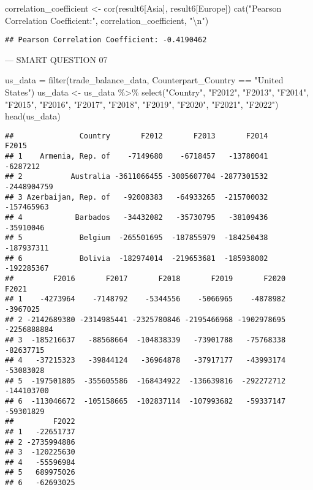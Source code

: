 \documentclass[
]{article}
\newenvironment{Shaded}{\begin{snugshade}}{\end{snugshade}}
\newcommand{\FunctionTok}[1]{\textcolor[rgb]{0.00,0.00,0.00}{#1}}
\newcommand{\NormalTok}[1]{#1}
\newcommand{\OtherTok}[1]{\textcolor[rgb]{0.56,0.35,0.01}{#1}}
\newcommand{\SpecialCharTok}[1]{\textcolor[rgb]{0.00,0.00,0.00}{#1}}
\newcommand{\StringTok}[1]{\textcolor[rgb]{0.31,0.60,0.02}{#1}}
\begin{document}
\begin{Shaded}
\begin{Highlighting}[]
\NormalTok{correlation\_coefficient }\OtherTok{\textless{}{-}} \FunctionTok{cor}\NormalTok{(result6[}\StringTok{\textquotesingle{}Asia\textquotesingle{}}\NormalTok{], result6[}\StringTok{\textquotesingle{}Europe\textquotesingle{}}\NormalTok{])}
\FunctionTok{cat}\NormalTok{(}\StringTok{"Pearson Correlation Coefficient:"}\NormalTok{, correlation\_coefficient, }\StringTok{"}\SpecialCharTok{\textbackslash{}n}\StringTok{"}\NormalTok{)}
\end{Highlighting}
\end{Shaded}

\begin{verbatim}
## Pearson Correlation Coefficient: -0.4190462
\end{verbatim}

--- SMART QUESTION 07

\begin{Shaded}
\begin{Highlighting}[]
\NormalTok{us\_data }\OtherTok{=} \FunctionTok{filter}\NormalTok{(trade\_balance\_data, Counterpart\_Country }\SpecialCharTok{==} \StringTok{"United States"}\NormalTok{)}
\NormalTok{us\_data }\OtherTok{\textless{}{-}}\NormalTok{ us\_data }\SpecialCharTok{\%\textgreater{}\%} 
  \FunctionTok{select}\NormalTok{(}\StringTok{"Country"}\NormalTok{, }\StringTok{"F2012"}\NormalTok{, }\StringTok{"F2013"}\NormalTok{, }\StringTok{"F2014"}\NormalTok{, }\StringTok{"F2015"}\NormalTok{, }\StringTok{"F2016"}\NormalTok{, }\StringTok{"F2017"}\NormalTok{, }\StringTok{"F2018"}\NormalTok{, }\StringTok{"F2019"}\NormalTok{, }\StringTok{"F2020"}\NormalTok{, }\StringTok{"F2021"}\NormalTok{, }\StringTok{"F2022"}\NormalTok{)}
\FunctionTok{head}\NormalTok{(us\_data)}
\end{Highlighting}
\end{Shaded}

\begin{verbatim}
##               Country       F2012       F2013       F2014       F2015
## 1    Armenia, Rep. of    -7149680    -6718457   -13780041    -6287212
## 2           Australia -3611066455 -3005607704 -2877301532 -2448904759
## 3 Azerbaijan, Rep. of   -92008383   -64933265  -215700032  -157465963
## 4            Barbados   -34432082   -35730795   -38109436   -35910046
## 5             Belgium  -265501695  -187855979  -184250438  -187937311
## 6             Bolivia  -182974014  -219653681  -185938002  -192285367
##         F2016       F2017       F2018       F2019       F2020       F2021
## 1    -4273964    -7148792    -5344556    -5066965    -4878982    -3967025
## 2 -2142689380 -2314985441 -2325780846 -2195466968 -1902978695 -2256888884
## 3  -185216637   -88568664  -104838339   -73901788   -75768338   -82637715
## 4   -37215323   -39844124   -36964878   -37917177   -43993174   -53083028
## 5  -197501805  -355605586  -168434922  -136639816  -292272712  -144103700
## 6  -113046672  -105158665  -102837114  -107993682   -59337147   -59301829
##         F2022
## 1   -22651737
## 2 -2735994886
## 3  -120225630
## 4   -55596984
## 5   689975026
## 6   -62693025
\end{verbatim}
\end{document}
